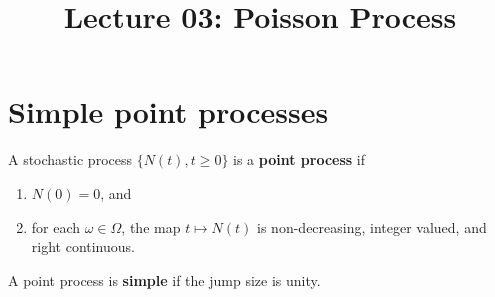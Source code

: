 \documentclass[a4paper,10pt,english]{article}
\title{Lecture 03: Poisson Process}
\begin{document}
\maketitle

\section{Simple point processes}
A stochastic process $\{N(t), t\geqslant 0\}$ is a \textbf{point process} if
\begin{enumerate}
  \item $N(0) = 0$, and 
  \item for each $\omega \in \Omega$, the map $t\mapsto N(t)$ is non-decreasing, integer valued, and right continuous.%
\end{enumerate}
A point process is \textbf{simple} if the jump size is unity.
\end{document}
